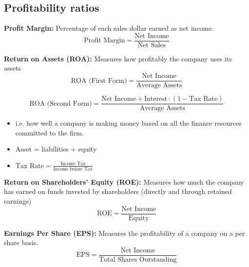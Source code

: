 \subsection{Profitability ratios}
\begin{definition}

    \textbf{Profit Margin:} Percentage of each sales dollar earned as net income.
    \begin{equation}
        \text{Profit Margin} = \frac{\text{Net Income}}{\text{Net Sales}}
    \end{equation}
    \vspace{1em}

    \textbf{Return on Assets (ROA):} Measures how profitably the company uses its assets
    \begin{equation}
        \text{ROA (First Form)} = \frac{\text{Net Income}}{\text{Average Assets}}
    \end{equation}

    \begin{equation}
        \text{ROA (Second Form)} = \frac{\text{Net Income} + \text{Interest} \cdot (1 - \text{Tax Rate})}{\text{Average Assets}}
    \end{equation}
    \begin{itemize}
        \item i.e. how well a company is making money based on all the finance resources committed to the firm.
    \end{itemize}

    \begin{itemize}
        \item Asset = liabilities + equity
        \item $\text{Tax Rate} = \frac{\text{Income Tax}}{\text{Income before Tax}}$
    \end{itemize}
    \vspace{1em}

    \textbf{Return on Shareholders' Equity (ROE):} Measures how much the company has earned on funds invested by shareholders (directly and through retained earnings)
    \begin{equation}
        \text{ROE} = \frac{\text{Net Income}}{\text{Equity}}
    \end{equation}
    \vspace{1em}

    \textbf{Earnings Per Share (EPS):} Measures the profitability of a company on a per share basis.
    \begin{equation}
        \text{EPS} = \frac{\text{Net Income}}{\text{Total Shares Outstanding}}
    \end{equation}
\end{definition}

